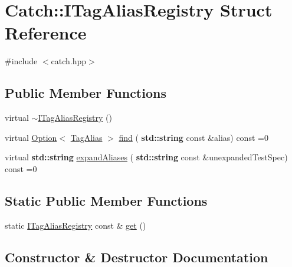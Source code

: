\hypertarget{struct_catch_1_1_i_tag_alias_registry}{}\section{Catch\+:\+:I\+Tag\+Alias\+Registry Struct Reference}
\label{struct_catch_1_1_i_tag_alias_registry}


{\ttfamily \#include $<$catch.\+hpp$>$}

\subsection*{Public Member Functions}
\begin{DoxyCompactItemize}
\item 
virtual \hyperlink{struct_catch_1_1_i_tag_alias_registry_a8967db4dd40b68e22697eff0f4928239}{$\sim$\+I\+Tag\+Alias\+Registry} ()
\item 
virtual \hyperlink{class_catch_1_1_option}{Option}$<$ \hyperlink{struct_catch_1_1_tag_alias}{Tag\+Alias} $>$ \hyperlink{struct_catch_1_1_i_tag_alias_registry_a7d2fba4d39cfcc62c2695fcde4f989c3}{find} (\textbf{ std\+::string} const \&alias) const =0
\item 
virtual \textbf{ std\+::string} \hyperlink{struct_catch_1_1_i_tag_alias_registry_ae729a7532faf7466db1a157ce0395170}{expand\+Aliases} (\textbf{ std\+::string} const \&unexpanded\+Test\+Spec) const =0
\end{DoxyCompactItemize}
\subsection*{Static Public Member Functions}
\begin{DoxyCompactItemize}
\item 
static \hyperlink{struct_catch_1_1_i_tag_alias_registry}{I\+Tag\+Alias\+Registry} const  \& \hyperlink{struct_catch_1_1_i_tag_alias_registry_aa9d0f008f49473389c7abf6071f137a7}{get} ()
\end{DoxyCompactItemize}


\subsection{Constructor \& Destructor Documentation}
\mbox{\label{struct_catch_1_1_i_tag_alias_registry_a8967db4dd40b68e22697eff0f4928239}} 
